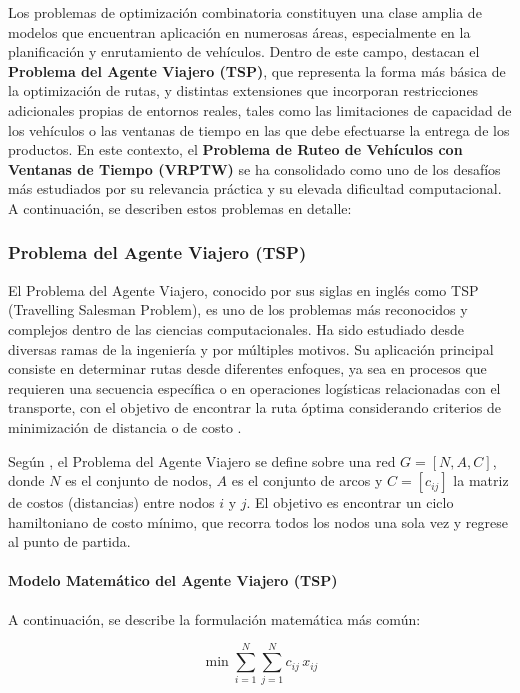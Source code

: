 \documentclass[12pt,titlepage,twoside,openright]{book}
\begin{document}
Los problemas de optimización combinatoria constituyen una clase amplia de modelos que encuentran aplicación en numerosas áreas, especialmente en la planificación y enrutamiento de vehículos. Dentro de este campo, destacan el \textbf{Problema del Agente Viajero (TSP)}, que representa la forma más básica de la optimización de rutas, y distintas extensiones que incorporan restricciones adicionales propias de entornos reales, tales como las limitaciones de capacidad de los vehículos o las ventanas de tiempo en las que debe efectuarse la entrega de los productos. En este contexto, el \textbf{Problema de Ruteo de Vehículos con Ventanas de Tiempo (VRPTW)} se ha consolidado como uno de los desafíos más estudiados por su relevancia práctica y su elevada dificultad computacional. A continuación, se describen estos problemas en detalle:


\subsubsection{Problema del Agente Viajero (TSP)}
\label{subsec:problem_tsp}
El Problema del Agente Viajero, conocido por sus siglas en inglés como TSP (Travelling Salesman Problem), es uno de los problemas más reconocidos y complejos dentro de las ciencias computacionales. Ha sido estudiado desde diversas ramas de la ingeniería y por múltiples motivos. Su aplicación principal consiste en determinar rutas desde diferentes enfoques, ya sea en procesos que requieren una secuencia específica o en operaciones logísticas relacionadas con el transporte, con el objetivo de encontrar la ruta óptima considerando criterios de minimización de distancia o de costo \citep{lopez2014tabu}.

Según \citep{torres2018}, el Problema del Agente Viajero se define sobre una red \(G = [N,A,C]\), donde \(N\) es el conjunto de nodos, \(A\) es el conjunto de arcos y \(C = [c_{ij}]\) la matriz de costos (distancias) entre nodos \(i\) y \(j\). El objetivo es encontrar un ciclo hamiltoniano de costo mínimo, que recorra todos los nodos una sola vez y regrese al punto de partida.

\paragraph{Modelo Matemático del Agente Viajero (TSP)}

A continuación, se describe la formulación matemática más común:

\begin{equation}
\min \sum_{i=1}^N \sum_{j=1}^N c_{ij}\,x_{ij}
\label{eq:TSP_obj}
\end{equation}
\end{document}
